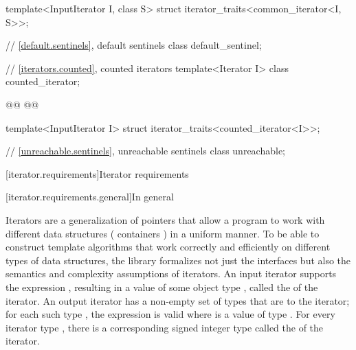 \begin{addedblock}
\begin{codeblock}
  template<InputIterator I, class S>
    struct iterator_traits<common_iterator<I, S>>;

  // \ref{default.sentinels}, default sentinels
  class default_sentinel;

  // \ref{iterators.counted}, counted iterators
  template<Iterator I> class counted_iterator;

  @@
    @@

  template<InputIterator I>
    struct iterator_traits<counted_iterator<I>>;

  // \ref{unreachable.sentinels}, unreachable sentinels
  class unreachable;
\end{codeblock}\end{addedblock}\begin{codeblock}

  // \ref{stream.iterators}, stream iterators
  [...]
}
\end{codeblock}

[iterator.requirements]{Iterator requirements}

[iterator.requirements.general]{In general}

\pnum
{}%
Iterators are a generalization of pointers that allow a \Cpp{} program
to work with different data structures
( containers ) in a uniform manner.
To be able to construct template algorithms that work correctly and efficiently
on different types of data structures, the library formalizes  not just
the interfaces but also the semantics and complexity assumptions of iterators.
An input iterator
supports the expression
,
resulting in a value of some object type
,
called the
of the iterator.
An output iterator  has a non-empty set of types that are
 to the iterator;
for each such type , the expression 
is valid where  is a value of type .
For every iterator type
, there is a corresponding signed integer type called the
of the iterator.


